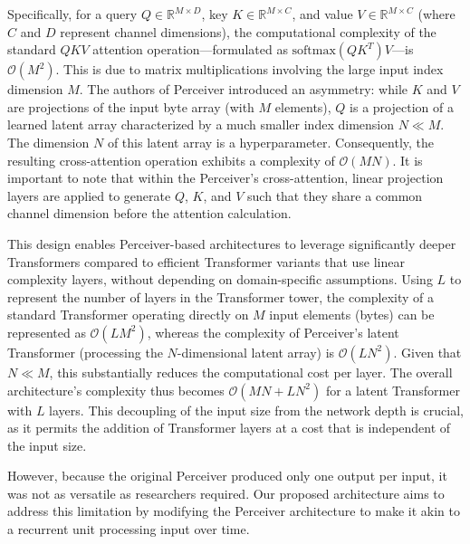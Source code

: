 Specifically, for a query $Q \in \mathbb{R}^{M \times D}$, key $K \in \mathbb{R}^{M \times C}$, and value $V \in \mathbb{R}^{M \times C}$ (where $C$ and $D$ represent channel dimensions), the computational complexity of the standard $QKV$ attention operation---formulated as $\text{softmax}(QK^T)V$---is $\mathcal{O}(M^2)$. This is due to matrix multiplications involving the large input index dimension $M$. The authors of Perceiver introduced an asymmetry: while $K$ and $V$ are projections of the input byte array (with $M$ elements), $Q$ is a projection of a learned latent array characterized by a much smaller index dimension $N \ll M$. The dimension $N$ of this latent array is a hyperparameter. Consequently, the resulting cross-attention operation exhibits a complexity of $\mathcal{O}(MN)$. It is important to note that within the Perceiver's cross-attention, linear projection layers are applied to generate $Q$, $K$, and $V$ such that they share a common channel dimension before the attention calculation.

This design enables Perceiver-based architectures to leverage significantly deeper Transformers compared to efficient Transformer variants that use linear complexity layers, without depending on domain-specific assumptions. Using $L$ to represent the number of layers in the Transformer tower, the complexity of a standard Transformer operating directly on $M$ input elements (bytes) can be represented as $\mathcal{O}(LM^2)$, whereas the complexity of Perceiver's latent Transformer (processing the $N$-dimensional latent array) is $\mathcal{O}(LN^2)$. Given that $N \ll M$, this substantially reduces the computational cost per layer. The overall architecture's complexity thus becomes $\mathcal{O}(MN + LN^2)$ for a latent Transformer with $L$ layers. This decoupling of the input size from the network depth is crucial, as it permits the addition of Transformer layers at a cost that is independent of the input size.

However, because the original Perceiver produced only one output per input, it was not as versatile as researchers required. Our proposed architecture aims to address this limitation by modifying the Perceiver architecture to make it akin to a recurrent unit processing input over time.


